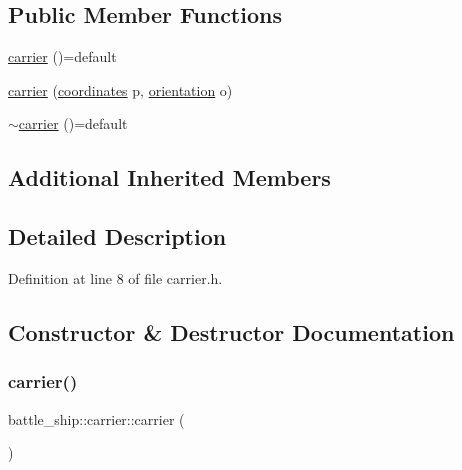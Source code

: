 \subsection*{Public Member Functions}
\begin{DoxyCompactItemize}
\item 
\hyperlink{classbattle__ship_1_1carrier_a9eaaa54c8884c25a1f99c397df789ca0}{carrier} ()=default
\item 
\hyperlink{classbattle__ship_1_1carrier_a3bb443575cd2f35ab21981b984c0fa02}{carrier} (\hyperlink{structbattle__ship_1_1coordinates}{coordinates} p, \hyperlink{namespacebattle__ship_aed87488f0a73f0d0679fe343fb61c784}{orientation} o)
\item 
\hyperlink{classbattle__ship_1_1carrier_a3642e56afffedbe7e20af863d0dde697}{$\sim$carrier} ()=default
\end{DoxyCompactItemize}
\subsection*{Additional Inherited Members}


\subsection{Detailed Description}


Definition at line 8 of file carrier.\+h.



\subsection{Constructor \& Destructor Documentation}
\mbox{\label{classbattle__ship_1_1carrier_a9eaaa54c8884c25a1f99c397df789ca0}} 
\subsubsection{\texorpdfstring{carrier()}{carrier()}\hspace{0.1cm}{\footnotesize\ttfamily [1/2]}}
{\footnotesize\ttfamily battle\+\_\+ship\+::carrier\+::carrier (\begin{DoxyParamCaption}{ }\end{DoxyParamCaption})\hspace{0.3cm}{\ttfamily [default]}}


